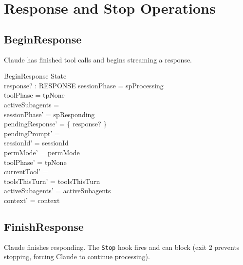 \documentclass[a4paper,10pt,fleqn]{article}
\begin{document}
\section{Response and Stop Operations}

\subsection{BeginResponse}

Claude has finished tool calls and begins streaming a response.

\begin{schema}{BeginResponse}
  \Delta State \\
  response? : RESPONSE
  \where
  sessionPhase = spProcessing \\
  toolPhase = tpNone \\
  activeSubagents = \emptyset \\
  sessionPhase' = spResponding \\
  pendingResponse' = \{ response? \} \\
  pendingPrompt' = \emptyset \\
  sessionId' = sessionId \\
  permMode' = permMode \\
  toolPhase' = tpNone \\
  currentTool' = \emptyset \\
  toolsThisTurn' = toolsThisTurn \\
  activeSubagents' = activeSubagents \\
  context' = context
\end{schema}

\subsection{FinishResponse}

Claude finishes responding. The \texttt{Stop} hook fires and can block
(exit 2 prevents stopping, forcing Claude to continue processing).
\end{document}
